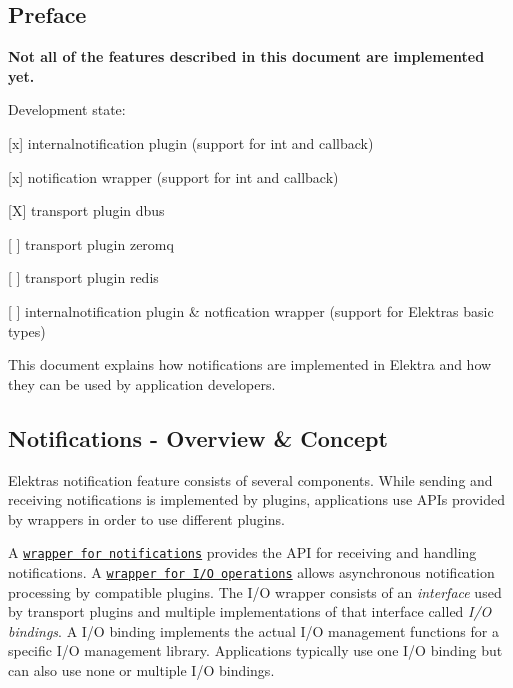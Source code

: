 \subsection*{Preface}

{\bfseries Not all of the features described in this document are implemented yet.}

Development state\+:


\begin{DoxyItemize}
\item \mbox{[}x\mbox{]} internalnotification plugin (support for int and callback)
\item \mbox{[}x\mbox{]} notification wrapper (support for int and callback)
\item \mbox{[}X\mbox{]} transport plugin dbus
\item \mbox{[} \mbox{]} transport plugin zeromq
\item \mbox{[} \mbox{]} transport plugin redis
\item \mbox{[} \mbox{]} internalnotification plugin \& notfication wrapper (support for Elektra\textquotesingle{}s basic types)
\end{DoxyItemize}

This document explains how notifications are implemented in Elektra and how they can be used by application developers.

\subsection*{Notifications -\/ Overview \& Concept}

Elektra\textquotesingle{}s notification feature consists of several components. While sending and receiving notifications is implemented by plugins, applications use A\+P\+Is provided by wrappers in order to use different plugins.

A \href{https://doc.libelektra.org/api/current/html/group__kdbnotification.html}{\tt wrapper for notifications} provides the A\+PI for receiving and handling notifications. A \href{https://doc.libelektra.org/api/current/html/group__kdbio.html}{\tt wrapper for I/O operations} allows asynchronous notification processing by compatible plugins. The I/O wrapper consists of an {\itshape interface} used by transport plugins and multiple implementations of that interface called {\itshape I/O bindings}. A I/O binding implements the actual I/O management functions for a specific I/O management library. Applications typically use one I/O binding but can also use none or multiple I/O bindings.

